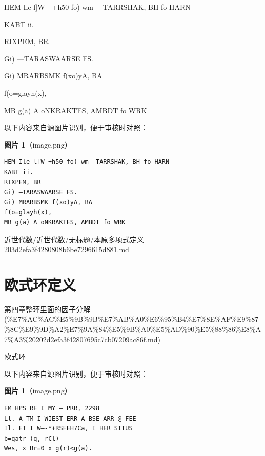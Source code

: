 \begin{definition}[本原多项式定义]

HEM Ile l]W—+h50 fo) wm—-TARRSHAK, BH fo HARN

KABT ii.

RIXPEM, BR

Gi) —TARASWAARSE FS.

Gi) MRARBSMK f(xo)yA, BA

f(o=glayh(x),

MB g(a) A oNKRAKTES, AMBDT fo WRK

\end{definition}

\begin{note}
以下内容来自源图片识别，便于审核时对照：

\textbf{图片 1}（image.png）
\begin{Verbatim}[fontsize=\small]
HEM Ile l]W—+h50 fo) wm—-TARRSHAK, BH fo HARN
KABT ii.
RIXPEM, BR
Gi) —TARASWAARSE FS.
Gi) MRARBSMK f(xo)yA, BA
f(o=glayh(x),
MB g(a) A oNKRAKTES, AMBDT fo WRK
\end{Verbatim}

\end{note}

\begin{note}[来源路径]

近世代数/近世代数/无标题/本原多项式定义 203d2efa3f4280808b6be7296615d881.md

\end{note}

\section*{欧式环定义}

\begin{note}[来源上级主题]

第四章整环里面的因子分解 (\%E7\%AC\%AC\%E5\%9B\%9B\%E7\%AB\%A0\%E6\%95\%B4\%E7\%8E\%AF\%E9\%87\%8C\%E9\%9D\%A2\%E7\%9A\%84\%E5\%9B\%A0\%E5\%AD\%90\%E5\%88\%86\%E8\%A7\%A3\%20202d2efa3f42807695c7cb07209ac86f.md)

\end{note}

\begin{definition}[欧式环定义]

欧式环

\end{definition}

\begin{note}
以下内容来自源图片识别，便于审核时对照：

\textbf{图片 1}（image.png）
\begin{Verbatim}[fontsize=\small]
EM HPS RE I MY — PRR, 2298
Ll. A—TM I WIEST ERR A BSE ARR @ FEE
Il. ET I W—-*+RSFEH7Ca, I HER SITUS
b=qatr (q, r€l)
Wes, x Br=0 x g(r)<g(a).
\end{Verbatim}

\end{note}

